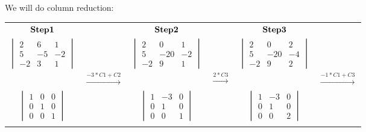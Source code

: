 \documentclass[]{article}
\begin{document}
We will do column reduction:\\
 \hspace{4 cm}
\begingroup
 
\begin{tabular}{ c c c c c c }
$\bold{Step 1}$ &  & $\bold{Step 2}$  &  & $\bold{Step 3}$ \\
$\begin{vmatrix} 2 & 6 & 1\\ 5 & -5 & -2 \\ -2 & 3 & 1 \end{vmatrix}$ &  & $\begin{vmatrix} 2 & 0 & 1\\ 5 & -20 & -2 \\ -2 & 9 & 1 \end{vmatrix}$ &  & $\begin{vmatrix} 2 & 0 & 2\\ 5 & -20 & -4 \\ -2 & 9 & 2 \end{vmatrix}$ \\  
 & $\xrightarrow{-3*C1 + C2}$ &  & $\xrightarrow{2*C3}$ & & $\xrightarrow{-1*C1+C3}$\\
$\begin{vmatrix} 1 &   0 &   0\\ 0 &   1 &   0 \\ 0 &   0 &   1 \end{vmatrix}$ &  & $\begin{vmatrix} 1 &   -3 &   0\\ 0 &   1 &   0 \\ 0 &   0 &   1 \end{vmatrix}$ &  & $\begin{vmatrix} 1 &   -3 &   0\\ 0 &   1 &   0 \\ 0 &   0 &   2 \end{vmatrix}$\\
 &  &  \\
\end{tabular}
\endgroup

\hspace{3cm}

\begingroup
\end{document}
